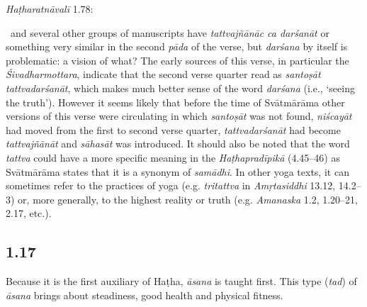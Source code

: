 \begin{ekdosis}
\begin{testimonia}[hp01_016]
\begin{versinnote}
\end{versinnote}

\emph{Haṭharatnāvalī} 1.78:

\begin{versinnote}
\tl{\var{niścayād ] niścalād- P,T}\\!}
\end{versinnote}

\end{testimonia}

\begin{philcomm}[hp01_016]    
\textalpha\ and several other groups of manuscripts have \emph{tattvajñānāc ca darśanāt} or something very similar in the second \emph{pāda} of the verse, but \emph{darśana} by itself is problematic: a vision of what? The early sources of this verse, in particular the \emph{Śivadharmottara}, indicate that the second verse quarter read as \emph{santoṣāt tattvadarśanāt}, which makes much better sense of the word \emph{darśana} (i.e., ‘seeing the truth’). However it seems likely that before the time of Svātmārāma other versions of this verse were circulating in which \emph{santoṣāt} was not found, \emph{niścayāt} had moved from the first to second verse quarter, \emph{tattvadarśanāt} had become \emph{tattvajñānāt} and \emph{sāhasāt} was introduced. It should also be noted that the word \emph{tattva} could have a more specific meaning in the \emph{Haṭhapradīpikā} (4.45–46) as Svātmārāma states that it is a synonym of \emph{samādhi}. In other yoga texts, it can sometimes refer to the practices of yoga (e.g. \emph{tritattva} in \emph{Amṛtasiddhi} 13.12, 14.2--3) or, more generally, to the highest reality or truth (e.g. \emph{Amanaska} 1.2, 1.20–21, 2.17, etc.).  
\end{philcomm}

\subsection*{1.17}
\begin{translation}[hp01_017]
Because it is the first auxiliary of Haṭha, \emph{āsana} is taught first. This type (\emph{tad}) of \emph{āsana} brings about steadiness, good health and physical fitness.
\end{translation}


\end{ekdosis}
